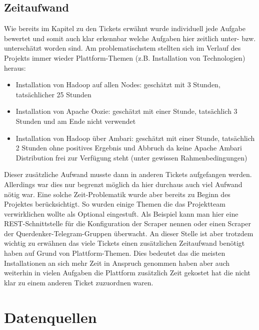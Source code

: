 \documentclass[12pt,oneside,a4paper,parskip]{scrbook}
\begin{document}
\section{Zeitaufwand}
Wie bereits im Kapitel zu den Tickets erw\"ahnt wurde individuell jede Aufgabe bewertet und somit auch klar erkennbar welche Aufgaben hier zeitlich unter- bzw. untersch\"atzt worden sind. Am problematischstem stellten sich im Verlauf des Projekts immer wieder Plattform-Themen (z.B. Installation von Technologien) heraus:
\begin{itemize}
	\item Installation von Hadoop auf allen Nodes: gesch\"atzt mit 3 Stunden, tats\"achlicher 25 Stunden
	\item Installation von Apache Oozie: gesch\"atzt mit einer Stunde, tats\"achlich 3 Stunden und am Ende nicht verwendet
	\item Installation von Hadoop \"uber Ambari: gesch\"atzt mit einer Stunde, tats\"achlich 2 Stunden ohne positives Ergebnis und Abbruch da keine Apache Ambari Distribution frei zur Verf\"ugung steht (unter gewissen Rahmenbedingungen)
\end{itemize}
Dieser zus\"atzliche Aufwand musste dann in anderen Tickets aufgefangen werden. Allerdings war dies nur begrenzt m\"oglich da hier durchaus auch viel Aufwand n\"otig war. \newline
Eine solche Zeit-Problematik wurde aber bereits zu Beginn des Projektes ber\"ucksichtigt. So wurden einige Themen die das Projektteam verwirklichen wollte als Optional eingestuft. Als Beispiel kann man hier eine REST-Schnittstelle f\"ur die Konfiguration der Scraper nennen oder einen Scraper der Querdenker-Telegram-Gruppen \"uberwacht. \newline
An dieser Stelle ist aber trotzdem wichtig zu erw\"ahnen das viele Tickets einen zus\"atzlichen Zeitaufwand ben\"otigt haben auf Grund von Plattform-Themen. Dies bedeutet das die meisten Installationen an sich mehr Zeit in Anspruch genommen haben aber auch weiterhin in vielen Aufgaben die Plattform zus\"atzlich Zeit gekostet hat die nicht klar zu einem anderen Ticket zuzuordnen waren.
\chapter{Datenquellen}
\end{document}

